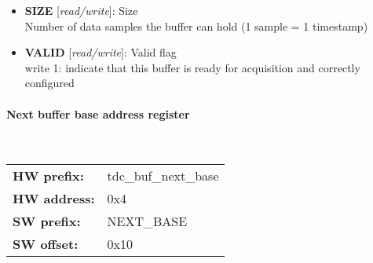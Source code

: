 \vspace{12pt}
\noindent
{}

\begin{itemize}
\item \begin{small}
{\bf 
SIZE
} [\emph{read/write}]: Size
\\
Number of data samples the buffer can hold (1 sample = 1 timestamp)
\end{small}
\item \begin{small}
{\bf 
VALID
} [\emph{read/write}]: Valid flag
\\
write 1: indicate that this buffer is ready for acquisition and correctly configured
\end{small}
\end{itemize}
\paragraph*{Next buffer base address register}\mbox{}\\\vskip 6pt
\begin{tabular}{l l }
{\bf HW prefix:}  & tdc\_buf\_next\_base\\
{\bf HW address:}  & 0x4\\
{\bf SW prefix:}  & NEXT\_BASE\\
{\bf SW offset:}  & 0x10\\
\end{tabular}


